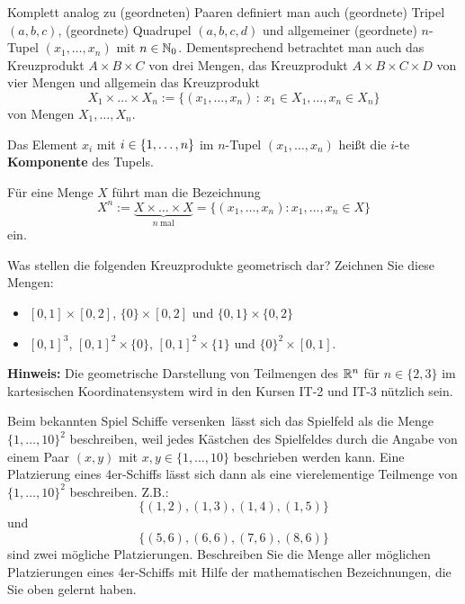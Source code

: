 \begin{defn} 
	Komplett analog zu (geordneten) Paaren definiert man auch (geordnete) Tripel $(a,b,c)$, (geordnete) Quadrupel $(a,b,c,d)$ und allgemeiner (geordnete) $n$-Tupel $(x_1,\ldots,x_n)$ mit $n \in \mathbb{N}_0$. Dementsprechend betrachtet man auch das Kreuzprodukt $A \times B \times C$ von drei Mengen, das Kreuzprodukt $A \times B \times C \times D$ von vier Mengen und allgemein das Kreuzprodukt 
	\[
	X_1 \times \ldots \times X_n := \{ (x_1,\ldots,x_n) \,:\, x_1 \in X_1, \ldots , x_n \in X_n \} 
	\]
	von Mengen $ X_1,\ldots,X_n $.
	
	Das Element $ x_i $ mit $ i \in \{ 1,\ldots,n \} $ im $ n $-Tupel $ (x_1,\ldots,x_n) $ heißt die $ i $-te \textbf{Komponente} des Tupels.
	
	Für eine Menge $ X $ führt man die Bezeichnung
	\begin{equation*}
		X^n := \underbrace{X \times \ldots \times X}_{n \:\text{mal}} = \{ (x_1,\ldots,x_n) : x_1,\ldots,x_n \in X \}
	\end{equation*}
	ein. 
\end{defn} 


\begin{aufg} Was stellen die folgenden Kreuzprodukte geometrisch dar? Zeichnen Sie diese Mengen:
	\begin{itemize}
		\item $ [0,1] \times [0,2] $, $ \{ 0 \} \times [0,2] $  und $ \{ 0,1 \} \times \{ 0,2 \} $ 
		\item $ [0,1]^3 $, $ [0,1]^2 \times \{ 0 \} $, $ [0,1]^2 \times \{ 1 \} $  und $ \{ 0 \}^2 \times [0,1] $. 
	\end{itemize}
	\textbf{Hinweis:} Die geometrische Darstellung von Teilmengen des $\mathbb{R}^n$ für $n \in \{2,3\}$ im kartesischen Koordinatensystem wird in den Kursen IT-2 und IT-3 nützlich sein. 
\end{aufg}

\begin{aufg}
	Beim bekannten Spiel \glqq Schiffe versenken\grqq\ lässt sich das Spielfeld als die Menge $\{1,\ldots,10\}^2$ beschreiben, weil jedes Kästchen des Spielfeldes durch die Angabe von einem Paar $(x,y)$ mit $x,y \in \{1,\ldots,10\}$ beschrieben werden kann. Eine Platzierung eines 4er-Schiffs lässt sich dann als eine vierelementige Teilmenge von $\{1,\ldots,10\}^2$ beschreiben. Z.B.: 
	\[ \{(1,2), (1,3),(1,4),(1,5)\}
	\] und 
	\[ \{(5,6),(6,6),(7,6),(8,6)\}
	\] sind zwei mögliche Platzierungen. Beschreiben Sie die Menge aller möglichen Platzierungen eines 4er-Schiffs mit Hilfe der mathematischen Bezeichnungen, die Sie oben gelernt haben. 
\end{aufg} 


